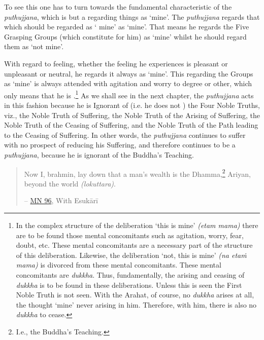 To see this one has to turn towards the fundamental characteristic of the \emph{puthujjana}, which is but a regarding things as `mine'. The \emph{puthujjana} regards that which should be regarded as ` mine' as `mine'. That means he regards the Five Grasping Groups (which constitute  for him) as `mine' whilst he should regard them as `not mine'.

With regard to feeling, whether the feeling he experiences is pleasant or unpleasant or neutral, he regards it always as `mine'. This regarding the Groups as `mine' is always attended with agitation and worry to  degree or other, which only means that he is .\footnote{In the complex structure of the deliberation `this is mine' \emph{(etam mama)} there are to be found those mental concomitants such as agitation, worry, fear, doubt, etc. These mental concomitants are a necessary part of the structure of this deliberation. Likewise, the deliberation `not, this is mine' \emph{(na etaṁ mama)} is divorced from these mental concomitants. These mental concomitants are \emph{dukkha}. Thus, fundamentally, the arising and ceasing of \emph{dukkha} is to be found in these deliberations. Unless this is seen the First Noble Truth is not seen. With the Arahat, of course, no \emph{dukkha} arises at all, the thought `mine' never arising in him. Therefore, with him, there is also no \emph{dukkha} to cease.} As we shall see in the next chapter, the \emph{puthujjana} acts in this fashion because he is Ignorant of (i.e. he does not ) the Four Noble Truths, viz., the Noble Truth of Suffering, the Noble Truth of the Arising of Suffering, the Noble Truth of the Ceasing of Suffering, and the Noble Truth of the Path leading to the Ceasing of Suffering. In other words, the \emph{puthujjana} continues to suffer with no prospect of reducing his Suffering, and therefore continues to be a \emph{puthujjana}, because he is ignorant of the Buddha's Teaching.

\bigskip

\begin{quote}
Now I, brahmin, lay down that a man's wealth is the Dhamma,\footnote{I.e., the Buddha's Teaching.} Ariyan, beyond the world \emph{(lokuttara)}.

 -- \href{https://suttacentral.net/mn96/en/sujato}{MN 96}, With Esukārī
\end{quote}
